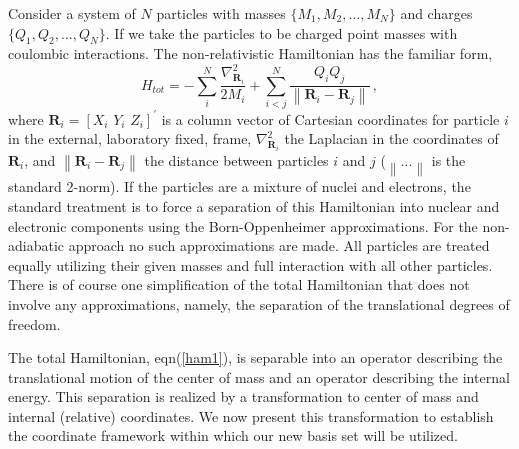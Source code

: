 \documentclass[12pt]{article}
\begin{document}
Consider a system of $N$ particles with masses $\{M_{1},M_{2},...,M_{N}\}$ and
charges $\{Q_{1},Q_{2},...,Q_{N}\}$. If we take the particles to be charged
point masses with coulombic interactions. The non-relativistic Hamiltonian has
the familiar form,
\begin{equation}
H_{tot}=-\sum_{i}^{N}\frac{\nabla_{\mathbf{R}_{i}}^{2}}{2M_{i}}+\sum_{i<j}%
^{N}\frac{Q_{i}Q_{j}}{\left\|  \mathbf{R}_{i}-\mathbf{R}_{j}\right\|
}\,,\label{ham1}%
\end{equation}
where $\mathbf{R}_{i}=[X_{i}\,\,Y_{i}\,\,Z_{i}]^{\prime}$ is a column vector
of Cartesian coordinates for particle $i$ in the external, laboratory fixed,
frame, $\nabla_{\mathbf{R}_{i}}^{2}$ the Laplacian in the coordinates of
$\mathbf{R}_{i}$, and $\left\|  \mathbf{R}_{i}-\mathbf{R}_{j}\right\|  $ the
distance between particles $i$ and $j$ ($\left\|  ...\right\|  $ is the
standard 2-norm). If the particles are a mixture of nuclei and electrons, the
standard treatment is to force a separation of this Hamiltonian into nuclear
and electronic components using the Born-Oppenheimer approximations. For the
non-adiabatic approach no such approximations are made. All particles are
treated equally utilizing their given masses and full interaction with all
other particles. There is of course one simplification of the total
Hamiltonian that does not involve any approximations, namely, the separation
of the translational degrees of freedom.

The total Hamiltonian, eqn(\ref{ham1}), is separable into an operator
describing the translational motion of the center of mass and an operator
describing the internal energy. This separation is realized by a
transformation to center of mass and internal (relative) coordinates. We now
present this transformation to establish the coordinate framework within which
our new basis set will be utilized.
\end{document}
